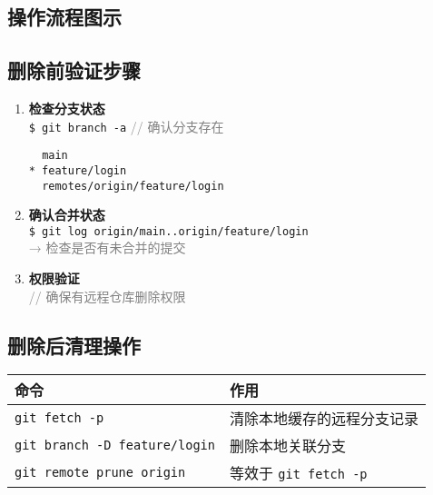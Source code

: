 \subsection{操作流程图示}
\begin{center}
\end{center}

\subsection{删除前验证步骤}
\begin{enumerate}[leftmargin=*, nosep]
    \item \textbf{检查分支状态} \\
    {\color{red}\texttt{\$ git branch -a}}   \quad \textcolor{gray}{// 确认分支存在}
    \begin{verbatim}
  main
* feature/login
  remotes/origin/feature/login
    \end{verbatim}
    
    \item \textbf{确认合并状态} \\
    \texttt{\$ git log origin/main..origin/feature/login} \\
    \textcolor{gray}{→ 检查是否有未合并的提交}
    
    \item \textbf{权限验证} \\
    \textcolor{gray}{// 确保有远程仓库删除权限}
\end{enumerate}

\subsection{删除后清理操作}
\begin{center}
\begin{tabular}{@{}ll@{}}
    \toprule
    \textbf{命令} & \textbf{作用} \\
    \midrule
    \texttt{git fetch -p} & 清除本地缓存的远程分支记录 \\
    \texttt{git branch -D feature/login} & 删除本地关联分支 \\
    \texttt{git remote prune origin} & 等效于 \texttt{git fetch -p} \\
    \bottomrule
\end{tabular}
\end{center}

